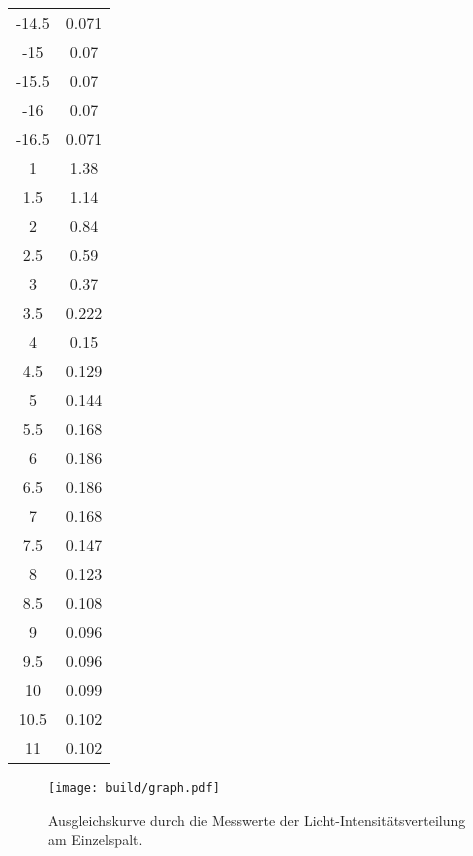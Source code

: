 \begin{table}
\begin{tabular}[t]{S[table-format=1.1] S}
-14.5  &      0.071    \\
-15    &    0.07     \\
-15.5  &      0.07    \\
-16    &    0.07     \\
-16.5  &      0.071    \\
1      &  1.38   \\
1.5    &    1.14     \\
2      &  0.84     \\
2.5    &    0.59     \\
3      &  0.37     \\
3.5    &    0.222    \\
4      &  0.15     \\
4.5    &    0.129    \\
5      &  0.144    \\
5.5    &    0.168    \\
6      &  0.186    \\
6.5    &    0.186    \\
7      &  0.168   \\
7.5    &    0.147    \\
8      &  0.123    \\
8.5    &    0.108    \\
9      &  0.096    \\
9.5    &    0.096    \\
10     &   0.099    \\
10.5   &     0.102    \\
11     &   0.102   \\

        
        \bottomrule
    \end{tabular}
\end{table}

\begin{figure}
\centering
\caption{Ausgleichskurve durch die Messwerte der Licht-Intensitätsverteilung am Einzelspalt.}
\texttt{[image: build/graph.pdf]}
\label{fig:graph}
\end{figure}
%
